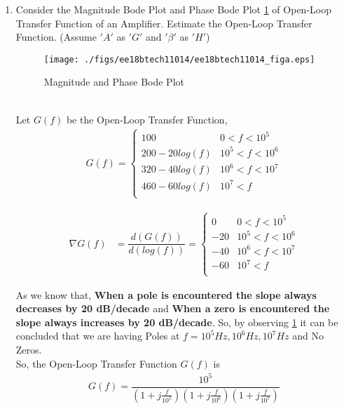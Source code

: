 \begin{enumerate}[label=\thesubsection.\arabic*.,ref=\thesubsection.\theenumi]

\item Consider the Magnitude Bode Plot and Phase Bode Plot \ref{fig:Bode} of Open-Loop Transfer Function of an Amplifier. Estimate the Open-Loop Transfer Function. (Assume $'A'$ as $'G'$ and $'\beta'$ as $'H'$)
\begin{figure}[ht!]
	\begin{center}
		\texttt{[image: ./figs/ee18btech11014/ee18btech11014\_figa.eps]}
	\end{center}
	\caption{Magnitude and Phase Bode Plot}
	\label{fig:Bode}
\end{figure}\\
\solution Let $G(f)$ be the Open-Loop Transfer Function,
\begin{align}
G(f) = 
\begin{cases} 
      100 & 0 < f < 10^{5} \\
      200-20log(f) & 10^{5} < f < 10^{6} \\
      320-40log(f) & 10^{6} < f < 10^{7} \\
      460-60log(f) & 10^{7} < f  \\
\end{cases}
\end{align}

\begin{align}
\nabla G(f) &= \dfrac{d(G(f))}{d(log(f))} =
\begin{cases} 
        0 & 0 < f < 10^{5} \\
      -20 & 10^{5} < f < 10^{6} \\
      -40 & 10^{6} < f < 10^{7} \\
      -60 & 10^{7} < f  \\ 
\end{cases}
\end{align}

As we know that, \textbf{When a pole is encountered the slope always decreases by 20 dB/decade} and \textbf{When a zero is encountered the slope always increases by 20 dB/decade}. So, by observing \ref{fig:Bode} it can be concluded that we are having Poles at $f=10^{5} Hz, 10^{6} Hz, 10^{7} Hz$ and No Zeros.\\

So, the Open-Loop Transfer Function $G(f)$ is
\begin{align}
	G(f) = \dfrac{10^{5}}{\left(1+j\frac{f}{10^{5}}\right)\left(1+j\frac{f}{10^{6}}\right)\left(1+j\frac{f}{10^{7}}\right)}
\end{align}\\


\end{enumerate}
